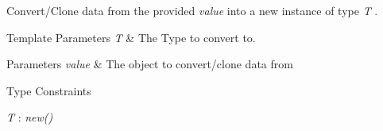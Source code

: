 Convert/\+Clone data from the provided {\itshape value}  into a new instance of type {\itshape T} . 


\begin{DoxyTemplParams}{Template Parameters}
{\em T} & The Type to convert to.\\
\hline
\end{DoxyTemplParams}

\begin{DoxyParams}{Parameters}
{\em value} & The object to convert/clone data from\\
\hline
\end{DoxyParams}
\begin{Desc}
\item[Type Constraints]\begin{description}
\item[{\em T} : {\em new()}]\end{description}
\end{Desc}

